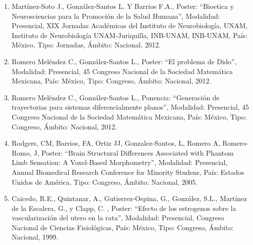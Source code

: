 \begin{enumerate}
\item Martínez-Soto J., González-Santos L. Y Barrios F.A., Poster: “Bioetica y Neurosciencias para la 
Promoción de 
la Salud Humana”, Modalidad: Presencial, XIX Jornadas Académicas del Instituto de Neurobiología, UNAM, 
Instituto de Neurobiología UNAM-Juriquilla, INB-UNAM, INB-UNAM, País: México, Tipo: Jornadas, Ámbito: 
Nacional, 2012.

\item Romero Meléndez C., González-Santos L., Poster: “El problema de Dido”, Modalidad: Presencial, 45 
Congreso 
Nacional de la Sociedad Matemática Mexicana, País: México, Tipo: Congreso, Ámbito: Nacional, 2012.

\item Romero Meléndez C., González-Santos L., Ponencia: “Generación de trayectorias para sistemas 
diferencialmente 
planos”, Modalidad: Presencial, 45 Congreso Nacional de la Sociedad Matemática Mexicana, País: México, Tipo: 
Congreso, Ámbito: Nacional, 2012.

\item Rodgers, CM, Barrios, FA, Ortiz JJ, Gonzalez-Santos, L, Romero A, Romero-Romo, J, Poster: “Brain 
Structural 
Differences Associated with Phantom Limb Sensation: A Voxel-Based Morphometry”, Modalidad: Presencial, Annual 
Biomedical Research Conference for Minority Studens, País: Estados Unidos de América, Tipo: Congreso, Ámbito: 
Nacional, 2005.

\item Caicedo, R.E., Quintanar, A., Gutierrez-Ospina, G., González, S.L., Martínez de la Escalera, G., y 
Clapp, C. , 
Poster: “Efecto de los estrogenos sobre la vascularización del utero en la rata”, Modalidad: Presencial, 
Congreso Nacional de Ciencias Fisiológicas, País: México, Tipo: Congreso, Ámbito: Nacional, 1999.

\end{enumerate}

